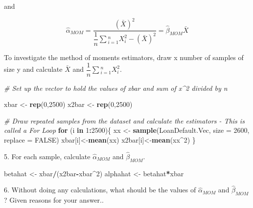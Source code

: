 \documentclass[
]{article}
\newenvironment{Shaded}{\begin{snugshade}}{\end{snugshade}}
\newcommand{\AttributeTok}[1]{\textcolor[rgb]{0.13,0.29,0.53}{#1}}
\newcommand{\CommentTok}[1]{\textcolor[rgb]{0.56,0.35,0.01}{\textit{#1}}}
\newcommand{\ConstantTok}[1]{\textcolor[rgb]{0.56,0.35,0.01}{#1}}
\newcommand{\ControlFlowTok}[1]{\textcolor[rgb]{0.13,0.29,0.53}{\textbf{#1}}}
\newcommand{\DecValTok}[1]{\textcolor[rgb]{0.00,0.00,0.81}{#1}}
\newcommand{\FunctionTok}[1]{\textcolor[rgb]{0.13,0.29,0.53}{\textbf{#1}}}
\newcommand{\NormalTok}[1]{#1}
\newcommand{\OtherTok}[1]{\textcolor[rgb]{0.56,0.35,0.01}{#1}}
\newcommand{\SpecialCharTok}[1]{\textcolor[rgb]{0.81,0.36,0.00}{\textbf{#1}}}
\begin{document}
{ and}

\[\begin{equation}
 \hat{\alpha}_{MOM} =   \dfrac{(\bar{X})^2}{\dfrac{1}{n}\sum{_{i = 1}^{n}  X_i^2} - (\bar{X})^2} = \hat{\beta}_{MOM} \bar{X}
\end{equation}\]

{ To investigate the method of moments estimators, draw x number of
samples of size y and calculate \(\bar{X}\) and
\(\dfrac{1}{n}\sum{_{i = 1}^{n} X_i^2}\).}

\begin{Shaded}
\begin{Highlighting}[]
\CommentTok{\# Set up the vector to hold the values of xbar and sum of x\^{}2 divided by n}

\NormalTok{xbar }\OtherTok{\textless{}{-}} \FunctionTok{rep}\NormalTok{(}\DecValTok{0}\NormalTok{,}\DecValTok{2500}\NormalTok{)}
\NormalTok{x2bar }\OtherTok{\textless{}{-}} \FunctionTok{rep}\NormalTok{(}\DecValTok{0}\NormalTok{,}\DecValTok{2500}\NormalTok{)}


\CommentTok{\# Draw repeated samples from the dataset and calculate the estimators {-} This is called a For Loop}
\ControlFlowTok{for}\NormalTok{ (i }\ControlFlowTok{in} \DecValTok{1}\SpecialCharTok{:}\DecValTok{2500}\NormalTok{)\{}
\NormalTok{  xx }\OtherTok{\textless{}{-}} \FunctionTok{sample}\NormalTok{(LoanDefault.Vec, }\AttributeTok{size =} \DecValTok{2600}\NormalTok{, }\AttributeTok{replace =} \ConstantTok{FALSE}\NormalTok{)}
\NormalTok{  xbar[i]}\OtherTok{\textless{}{-}}\FunctionTok{mean}\NormalTok{(xx)}
\NormalTok{  x2bar[i]}\OtherTok{\textless{}{-}}\FunctionTok{mean}\NormalTok{(xx}\SpecialCharTok{\^{}}\DecValTok{2}\NormalTok{)}
\NormalTok{  \}}
\end{Highlighting}
\end{Shaded}

{ 5. For each sample, calculate \(\hat{\alpha}_{MOM}\) and
\(\hat{\beta}_{MOM}\)}.

\begin{Shaded}
\begin{Highlighting}[]
\NormalTok{betahat }\OtherTok{\textless{}{-}}\NormalTok{ xbar}\SpecialCharTok{/}\NormalTok{(x2bar}\SpecialCharTok{{-}}\NormalTok{xbar}\SpecialCharTok{\^{}}\DecValTok{2}\NormalTok{)}
\NormalTok{alphahat }\OtherTok{\textless{}{-}}\NormalTok{ betahat}\SpecialCharTok{*}\NormalTok{xbar}
\end{Highlighting}
\end{Shaded}

{ 6. Without doing any calculations, what should be the values of
\(\hat{\alpha}_{MOM}\) and \(\hat{\beta}_{MOM}\)? Given reasons for your
answer.}.
\end{document}
